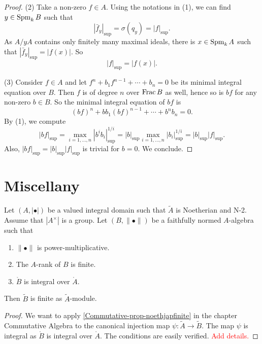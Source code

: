 \begin{proof}
    (2) Take a non-zero $f\in A$.
    Using the notations in (1),
    we can find $y\in \operatorname{Spm}_k B$ such that 
    \[
        |\bar{f}_y|_{\sup}=\sigma(q_y)=|f|_{\sup}.  
    \]
    As $A/yA$ contains only finitely many maximal ideals, there is $x\in \operatorname{Spm}_k A$ such that $|\bar{f}_y|_{\sup}=|f(x)|$. So 
    \[
        |f|_{\sup}=|f(x)|.
    \]

    (3) Consider $f\in A$ and let $f^n+b_1f^{n-1}+\cdots+b_n=0$ be its minimal integral equation over $B$. Then $f$ is of degree $n$ over $\operatorname{Frac} B$ as well, hence so is $bf$ for any non-zero $b\in B$. So the minimal integral equation of $bf$ is 
    \[
        (bf)^n+bb_1(bf)^{n-1}+\cdots+b^nb_n=0.
    \]
    By (1), we compute
    \[
        |bf|_{\sup}=\max_{i=1,\ldots,n} |b^ib_i|_{\sup}^{1/i}=|b|_{\sup}\max_{i=1,\ldots,n}|b_i|_{\sup}^{1/i}=|b|_{\sup}|f|_{\sup}.
    \]
    Also, $|bf|_{\sup}=|b|_{\sup}|f|_{\sup}$ is trivial for $b=0$. We conclude.
\end{proof}

\section{Miscellany}


\begin{lemma}\label{lma-finitemodulejapanese}
    Let $(A,|\bullet|)$ be a valued integral domain such that $\tilde{A}$ is Noetherian and N-2. Assume that $|A^{\times}|$ is a group. Let $(B,\|\bullet\|)$ be a faithfully normed $A$-algebra such that
    \begin{enumerate}
        \item $\|\bullet\|$ is power-multiplicative.
        \item The $A$-rank of $B$ is finite.
        \item $\mathring{B}$ is integral over $\mathring{A}$.
    \end{enumerate}
    Then $\tilde{B}$ is finite as $\tilde{A}$-module.
\end{lemma}
\begin{proof}
    We want to apply \cref{Commutative-prop-noethjapfinite} in the chapter Commutative Algebra to the canonical injection map $\psi:\tilde{A}\rightarrow \tilde{B}$. The map $\psi$ is integral as $\mathring{B}$ is integral over $\mathring{A}$. The conditions are easily verified. \textcolor{red}{Add details.}
\end{proof}


\printbibliography
